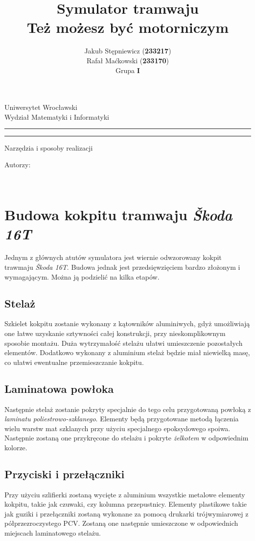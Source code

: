 \documentclass[12pt,a4paper]{article}
\author{Jakub Stępniewicz (\textbf{233217})\\Rafał Maćkowski (\textbf{233170})\\Grupa {\bf I}}
\title{Symulator tramwaju\\ \small{Też możesz być motorniczym}}
\makeatletter
\newcommand{\linia}{\rule{\linewidth}{0.4mm}}
\renewcommand{\maketitle}{\begin{titlepage}
		\vspace*{1cm}
    \begin{center}\small
    	Uniwersytet Wrocławski\\
    	Wydział Matematyki i Informatyki\\
    \end{center}
    \vspace{3cm}
    \noindent
    \linia
    \begin{center}
    	\LARGE{\textsc{\@title}}
         \end{center}
     \linia
    \begin{center}
    	\Large{Narzędzia i sposoby realizacji}
         \end{center}
    \vspace{0.5cm}

    \begin{flushright}

    \begin{minipage}{5.5cm}

    	\small Autorzy:

    \normalsize {\@author} \par
    

    \end{minipage}
    \vspace{5cm}

     

     \end{flushright}

    \vspace*{\stretch{6}}

    \begin{center}

    \@date\\

    \end{center}

  \end{titlepage}%

}
\makeatother
\begin{document}
\maketitle
\tableofcontents
\vspace{5cm}
\newpage
% 
\section{Budowa kokpitu tramwaju {\it Škoda 16T}}
Jednym z głównych atutów symulatora jest wiernie odwzorowany kokpit trawmaju {\it Škoda 16T}. Budowa
jednak jest przedsięwzięciem bardzo złożonym i wymagającym. Można ją podzielić na kilka etapów.
\subsection{Stelaż}
Szkielet kokpitu zostanie wykonany z kątowników aluminiwych, gdyż umożliwiają one łatwe uzyskanie
sztywności całej konstrukcji, przy nieskomplikownym sposobie montażu. Duża wytrzymałość stelażu
ułatwi umieszczenie pozostałych elementów. Dodatkowo wykonany z aluminium stelaż będzie miał
niewielką masę, co ułatwi ewentualne przemieszczanie kokpitu.

\subsection{Laminatowa powłoka}
Następnie stelaż zostanie pokryty specjalnie do tego celu przygotowaną powłoką z {\it laminatu poliestrowo-szklanego}.
Elementy będą przygotowane metodą łączenia wielu warstw mat szklanych przy użyciu specjalnego
epoksydowego spoiwa. Następnie zostaną one przykręcone do stelażu i pokryte {\it żelkotem} w
odpowiednim kolorze.

\subsection{Przyciski i przełączniki}
Przy użyciu szlifierki zostaną wycięte z aluminium wszystkie metalowe elementy kokpitu, takie jak
czuwaki, czy kolumna przepustnicy. Elementy plastikowe takie jak guziki i przełączniki zostaną
wykonane za pomocą drukarki trójwymiarowej z półprzezroczystego PCV. Zostaną one następnie
umieszczone w odpowiednich miejscach laminatowego stelażu. 
\end{document}
